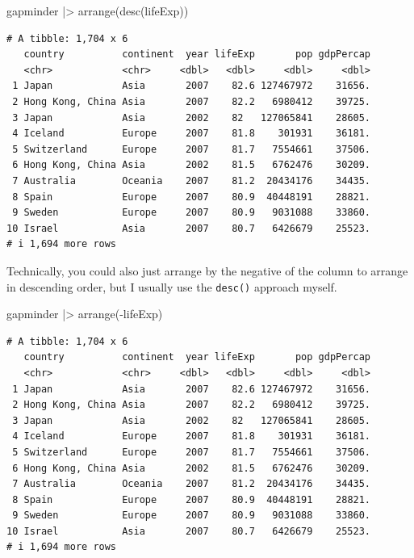 \documentclass[
  letterpaper,
  DIV=11,
  numbers=noendperiod]{scrreprt}
\newenvironment{Shaded}{\begin{snugshade}}{\end{snugshade}}
\newcommand{\FunctionTok}[1]{\textcolor[rgb]{0.28,0.35,0.67}{#1}}
\newcommand{\NormalTok}[1]{\textcolor[rgb]{0.00,0.23,0.31}{#1}}
\newcommand{\SpecialCharTok}[1]{\textcolor[rgb]{0.37,0.37,0.37}{#1}}
\begin{document}
\begin{Shaded}
\begin{Highlighting}[]
\NormalTok{gapminder }\SpecialCharTok{|\textgreater{}}
  \FunctionTok{arrange}\NormalTok{(}\FunctionTok{desc}\NormalTok{(lifeExp))}
\end{Highlighting}
\end{Shaded}

\begin{verbatim}
# A tibble: 1,704 x 6
   country          continent  year lifeExp       pop gdpPercap
   <chr>            <chr>     <dbl>   <dbl>     <dbl>     <dbl>
 1 Japan            Asia       2007    82.6 127467972    31656.
 2 Hong Kong, China Asia       2007    82.2   6980412    39725.
 3 Japan            Asia       2002    82   127065841    28605.
 4 Iceland          Europe     2007    81.8    301931    36181.
 5 Switzerland      Europe     2007    81.7   7554661    37506.
 6 Hong Kong, China Asia       2002    81.5   6762476    30209.
 7 Australia        Oceania    2007    81.2  20434176    34435.
 8 Spain            Europe     2007    80.9  40448191    28821.
 9 Sweden           Europe     2007    80.9   9031088    33860.
10 Israel           Asia       2007    80.7   6426679    25523.
# i 1,694 more rows
\end{verbatim}

Technically, you could also just arrange by the negative of the column
to arrange in descending order, but I usually use the \texttt{desc()}
approach myself.

\begin{Shaded}
\begin{Highlighting}[]
\NormalTok{gapminder }\SpecialCharTok{|\textgreater{}}
  \FunctionTok{arrange}\NormalTok{(}\SpecialCharTok{{-}}\NormalTok{lifeExp)}
\end{Highlighting}
\end{Shaded}

\begin{verbatim}
# A tibble: 1,704 x 6
   country          continent  year lifeExp       pop gdpPercap
   <chr>            <chr>     <dbl>   <dbl>     <dbl>     <dbl>
 1 Japan            Asia       2007    82.6 127467972    31656.
 2 Hong Kong, China Asia       2007    82.2   6980412    39725.
 3 Japan            Asia       2002    82   127065841    28605.
 4 Iceland          Europe     2007    81.8    301931    36181.
 5 Switzerland      Europe     2007    81.7   7554661    37506.
 6 Hong Kong, China Asia       2002    81.5   6762476    30209.
 7 Australia        Oceania    2007    81.2  20434176    34435.
 8 Spain            Europe     2007    80.9  40448191    28821.
 9 Sweden           Europe     2007    80.9   9031088    33860.
10 Israel           Asia       2007    80.7   6426679    25523.
# i 1,694 more rows
\end{verbatim}
\end{document}
